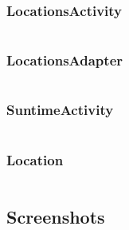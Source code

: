 \documentclass[11pt,english,numbers=endperiod,parskip=half]{scrartcl}
\begin{document}
\begin{landscape}

\subsubsection{LocationsActivity}
\inputminted[firstline=25, lastline=62]{java}{../../Apps/Suntime/app/src/main/java/au/net/danielparker/suntime/ui/LocationsActivity.java}

\subsubsection{LocationsAdapter}
\inputminted[firstline=16, lastline=38]{java}{../../Apps/Suntime/app/src/main/java/au/net/danielparker/suntime/ui/LocationsAdapter.java}

\subsubsection{SuntimeActivity}
\inputminted[firstline=21, lastline=80]{java}{../../Apps/Suntime/app/src/main/java/au/net/danielparker/suntime/ui/SuntimeActivity.java}

\subsubsection{Location}
\inputminted[firstline=15, lastline=71]{java}{../../Apps/Suntime/app/src/main/java/au/net/danielparker/suntime/models/Location.java}

\end{landscape}

\subsection{Screenshots}
\setlength\fboxsep{0pt}
\setlength\fboxrule{0.5pt}

\begin{figure}[H]
\\
\end{figure}
\bigskip
\end{document}
